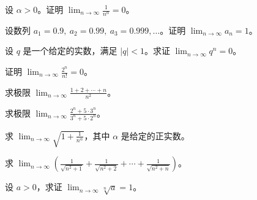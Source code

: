 \newpage
\noindent\begin{minipage}{\textwidth}
设 $\alpha>0$。证明 $\displaystyle\lim_{n\to\infty}\frac{1}{n^\alpha}=0$。
\end{minipage}\par\vfill
\noindent\begin{minipage}{\textwidth}
设数列 $a_1=0.9,\ a_2=0.99,\ a_3=0.999,\ldots$。证明 $\displaystyle\lim_{n\to\infty}a_n=1$。
\end{minipage}\par\vfill
\noindent\begin{minipage}{\textwidth}
设 $q$ 是一个给定的实数，满足 $|q|<1$。求证 $\displaystyle\lim_{n\to\infty}q^n=0$。
\end{minipage}\par\vfill
\noindent\begin{minipage}{\textwidth}
证明 $\displaystyle\lim_{n\to\infty}\frac{2^n}{n!}=0$。
\end{minipage}\par\vfill
\newpage
\noindent\begin{minipage}{\textwidth}
求极限 $\displaystyle\lim_{n\to\infty}\frac{1+2+\cdots+n}{n^2}$。
\end{minipage}\par\vfill
\noindent\begin{minipage}{\textwidth}
求极限 $\displaystyle\lim_{n\to\infty}\frac{2^n+5\cdot3^n}{3^n+5\cdot2^n}$。
\end{minipage}\par\vfill
\noindent\begin{minipage}{\textwidth}
求 $\displaystyle\lim_{n\to\infty}\sqrt{1+\frac1{n^\alpha}}$，其中 $\alpha$ 是给定的正实数。
\end{minipage}\par\vfill
\noindent\begin{minipage}{\textwidth}
求 $\displaystyle\lim_{n\to\infty}\left(\frac1{\sqrt{n^2+1}}+\frac1{\sqrt{n^2+2}}+\cdots+\frac1{\sqrt{n^2+n}}\right)$。
\end{minipage}\par\vfill
\newpage
\noindent\begin{minipage}{\textwidth}
设 $a>0$，求证 $\displaystyle\lim_{n\to\infty}\sqrt[n]{a}=1$。
\end{minipage}\par\vfill

